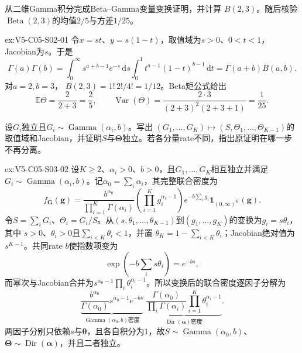 \begin{SLChapterExercisePairSection}
\begin{exercise}\label{ex:V5-C05-S02-01}
从二维Gamma积分完成Beta--Gamma变量变换证明，并计算
$B(2,3)$。随后核验$\operatorname{Beta}(2,3)$的均值$2/5$与方差$1/25$。
\end{exercise}
\ifSLFullEdition
{}\label{sol:V5-C05-S02-01}
\begin{chapterexercisesolution}{ex:V5-C05-S02-01}
\nopagebreak[4]
令$x=st$、$y=s(1-t)$，取值域为$s>0$、$0<t<1$，Jacobian为$s$。于是
\[
\Gamma(a)\Gamma(b)
=\int_0^\infty s^{a+b-1}e^{-s}\,\mathrm ds
\int_0^1t^{a-1}(1-t)^{b-1}\,\mathrm dt
=\Gamma(a+b)B(a,b).
\]
对$a=2,b=3$，
$B(2,3)=1!\,2!/4!=1/12$。Beta矩公式给出
\[
\mathbb E\Theta=\frac2{2+3}=\frac25,\qquad
\operatorname{Var}(\Theta)
=\frac{2\cdot3}{(2+3)^2(2+3+1)}
=\frac1{25}.
\]
\end{chapterexercisesolution}
\fi

\begin{exercise}\label{ex:V5-C05-S03-02}
设$G_i$独立且$G_i\sim\operatorname{Gamma}(\alpha_i,b)$。写出
$(G_1,\ldots,G_K)\mapsto(S,\Theta_1,\ldots,\Theta_{K-1})$的取值域和Jacobian，并证明$S$与$\boldsymbol\Theta$独立。若各分量rate不同，指出原证明在哪一步不再分离。
\end{exercise}
\ifSLFullEdition
{}\label{sol:V5-C05-S03-02}
\begin{chapterexercisesolution}{ex:V5-C05-S03-02}
\nopagebreak[4]
设$K\ge2$、$\alpha_i>0$、$b>0$，且$G_1,\ldots,G_K$相互独立并满足$G_i\sim\operatorname{Gamma}(\alpha_i,b)$。记$\alpha_0=\sum_i\alpha_i$，其完整联合密度为
\[
f_{\boldsymbol G}(\boldsymbol g)
=\frac{b^{\alpha_0}}{\prod_{i=1}^K\Gamma(\alpha_i)}
 \left(\prod_{i=1}^K g_i^{\alpha_i-1}\right)
 e^{-b\sum_i g_i}\boldsymbol1_{(0,\infty)^K}(\boldsymbol g).
\]
令$S=\sum_iG_i$、$\Theta_i=G_i/S$。从$(s,\theta_1,\ldots,\theta_{K-1})$到$(g_1,\ldots,g_K)$的变换为$g_i=s\theta_i$，其中
$s>0$、$\theta_i>0$且$\sum_{i<K}\theta_i<1$，并置
$\theta_K=1-\sum_{i<K}\theta_i$；Jacobian绝对值为$s^{K-1}$。共同rate $b$使指数项变为
\[
\exp\!\left(-b\sum_i s\theta_i\right)=e^{-bs},
\]
而幂次与Jacobian合并为$s^{\alpha_0-1}\prod_i\theta_i^{\alpha_i-1}$。所以变换后的联合密度逐因子分解为
\[
\underbrace{\frac{b^{\alpha_0}}{\Gamma(\alpha_0)}
s^{\alpha_0-1}e^{-bs}}_{\operatorname{Gamma}(\alpha_0,b)\text{密度}}
\;
\underbrace{\frac{\Gamma(\alpha_0)}{\prod_i\Gamma(\alpha_i)}
\prod_{i=1}^K\theta_i^{\alpha_i-1}}_{\operatorname{Dir}(\boldsymbol\alpha)\text{密度}}.
\]
两因子分别只依赖$s$与$\boldsymbol\theta$，且各自积分为$1$，故$S\sim\operatorname{Gamma}(\alpha_0,b)$、$\boldsymbol\Theta\sim\operatorname{Dir}(\boldsymbol\alpha)$，并且二者独立。


\end{chapterexercisesolution}
\end{SLChapterExercisePairSection}

